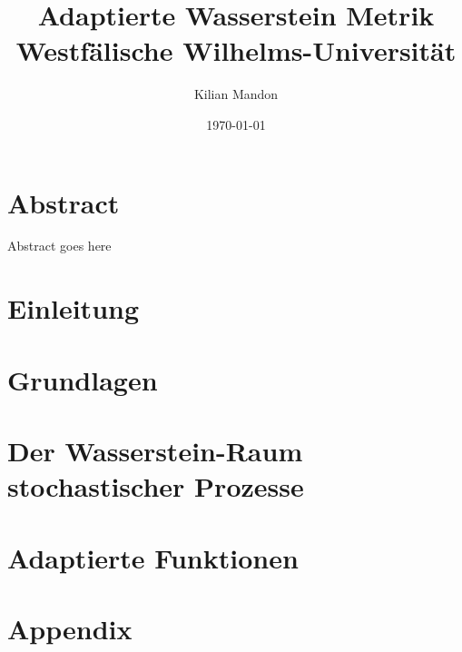 \documentclass[12pt]{article}
\theoremstyle{definition}
\begin{document}
\title{
    {Adaptierte Wasserstein Metrik} \\
    {Westfälische Wilhelms-Universität}
}

\author{Kilian Mandon}
\date{\today}

\maketitle

\section*{Abstract}
Abstract goes here

\section{Einleitung}


\section{Grundlagen}


\section{Der Wasserstein-Raum stochastischer Prozesse}


\section{Adaptierte Funktionen}


\section{Appendix}

\end{document}
